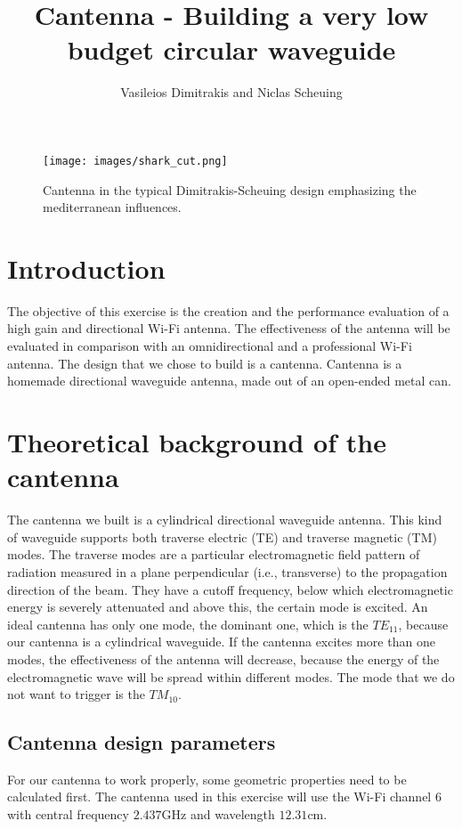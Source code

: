 \documentclass[12pt,a4paper]{article}
\title{Cantenna - Building a very low budget circular waveguide}
\author{Vasileios Dimitrakis and Niclas Scheuing}
\begin{document}
\maketitle
\begin{figure}[h]
	\texttt{[image: images/shark\_cut.png]}
	\caption{Cantenna in the typical Dimitrakis-Scheuing design emphasizing the mediterranean influences.}
	\label{shark}
\end{figure}
\pagebreak
\section{Introduction}
	The objective of this exercise is the creation and the performance evaluation of a high gain
	and directional Wi-Fi antenna. The effectiveness of the antenna will be evaluated in comparison with an omnidirectional and a professional Wi-Fi antenna. The design that we chose to build is a cantenna. Cantenna is a homemade directional waveguide antenna, made out of an open-ended metal can.

\section{Theoretical background of the cantenna}
	The cantenna we built is a cylindrical directional waveguide antenna. This kind of waveguide supports both traverse electric (TE) and traverse magnetic (TM) modes. The traverse modes are a particular electromagnetic field pattern of radiation measured in a plane perpendicular (i.e., transverse) to the propagation direction of the beam. They have a cutoff frequency, below which electromagnetic energy is severely attenuated and above this, the certain mode is excited. An ideal cantenna has only one mode, the dominant one, which is the $TE_{11}$, because our cantenna is a cylindrical waveguide. If the cantenna excites more than one modes, the effectiveness of the antenna will decrease, because the energy of the electromagnetic wave will be spread within different modes. The mode that we do not want to trigger is the $TM_{10}$.
	
	
	\subsection{Cantenna design parameters}
		For our cantenna to work properly, some geometric properties need to be calculated first.
		The cantenna used in this exercise will use the Wi-Fi channel $6$ with central frequency $2.437$GHz and wavelength $12.31$cm.
		
\end{document}
